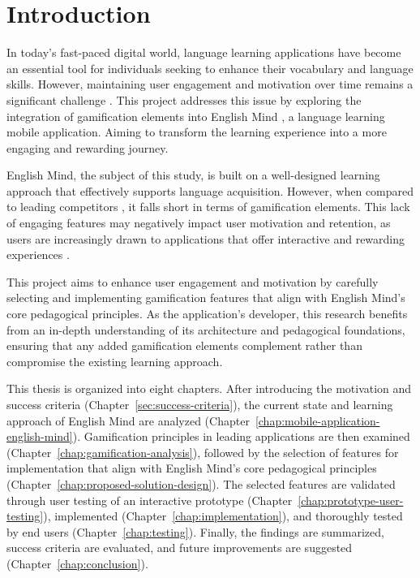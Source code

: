 \chapter{Introduction}

In today's fast-paced digital world, language learning applications have become an essential tool for individuals seeking to enhance their vocabulary and language skills. However, maintaining user engagement and motivation over time remains a significant challenge \cite{cite:govender2021_gamification_elements_in_language_learning_apps}. This project addresses this issue by exploring the integration of gamification elements into English Mind \cite{cite:english_mind_website}, a language learning mobile application. Aiming to transform the learning experience into a more engaging and rewarding journey.

English Mind, the subject of this study, is built on a well-designed learning approach that effectively supports language acquisition. However, when compared to leading competitors \cite{cite:duolingo, cite:wordup, cite:duocards}, it falls short in terms of gamification elements. This lack of engaging features may negatively impact user motivation and retention, as users are increasingly drawn to applications that offer interactive and rewarding experiences \cite{cite:deterding2011_gamefulness, cite:govender2021_gamification_elements_in_language_learning_apps}. 

This project aims to enhance user engagement and motivation by carefully selecting and implementing gamification features that align with English Mind's core pedagogical principles. As the application's developer, this research benefits from an in-depth understanding of its architecture and pedagogical foundations, ensuring that any added gamification elements complement rather than compromise the existing learning approach.

This thesis is organized into eight chapters. After introducing the motivation and success criteria (Chapter~\ref{sec:success-criteria}), the current state and learning approach of English Mind are analyzed (Chapter~\ref{chap:mobile-application-english-mind}). Gamification principles in leading applications are then examined (Chapter~\ref{chap:gamification-analysis}), followed by the selection of features for implementation that align with English Mind's core pedagogical principles (Chapter~\ref{chap:proposed-solution-design}). The selected features are validated through user testing of an interactive prototype (Chapter~\ref{chap:prototype-user-testing}), implemented (Chapter~\ref{chap:implementation}), and thoroughly tested by end users (Chapter~\ref{chap:testing}). Finally, the findings are summarized, success criteria are evaluated, and future improvements are suggested (Chapter~\ref{chap:conclusion}).


